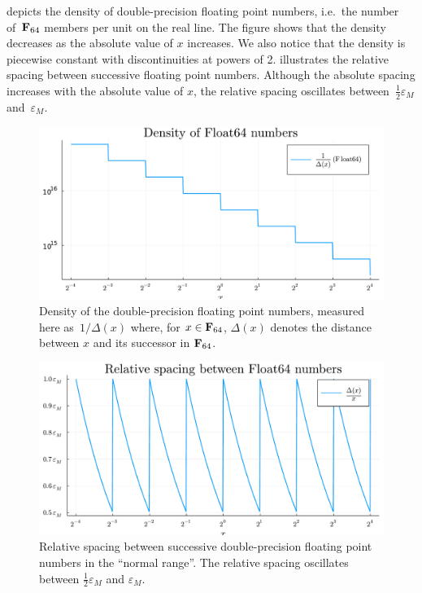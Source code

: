  depicts the density of double-precision floating point numbers,
i.e.\ the number of~$\mathbf F_{64}$ members per unit on the real line.
The figure shows that the density decreases as the absolute value of $x$ increases.
We also notice that the density is piecewise constant with discontinuities at powers of 2.
 illustrates the relative spacing between successive floating point numbers.
Although the absolute spacing increases with the absolute value of $x$,
the relative spacing oscillates between~$\frac{1}{2} \varepsilon_{M}$ and~$\varepsilon_M$.

\begin{figure}
    \centering
    \includegraphics[width=.8\textwidth]{figures/float64_density.pdf}
    \caption{%
        Density of the double-precision floating point numbers,
        measured here as~$1/\Delta(x)$ where,
        for $x \in \mathbf F_{64}$,
        $\Delta(x)$ denotes the distance between $x$ and its successor in $\mathbf F_{64}$.
    }%
    \label{fig:float64_density}%
\end{figure}

\begin{figure}[ht]
    \centering
    \includegraphics[width=.65\textwidth]{figures/float64_spacing.pdf}
    \caption{%
        Relative spacing between successive double-precision floating point numbers in the ``normal range''.
        The relative spacing oscillates between $\frac{1}{2} \varepsilon_M$ and $\varepsilon_M$.
    }%
    \label{fig:float64_spacing}
\end{figure}

